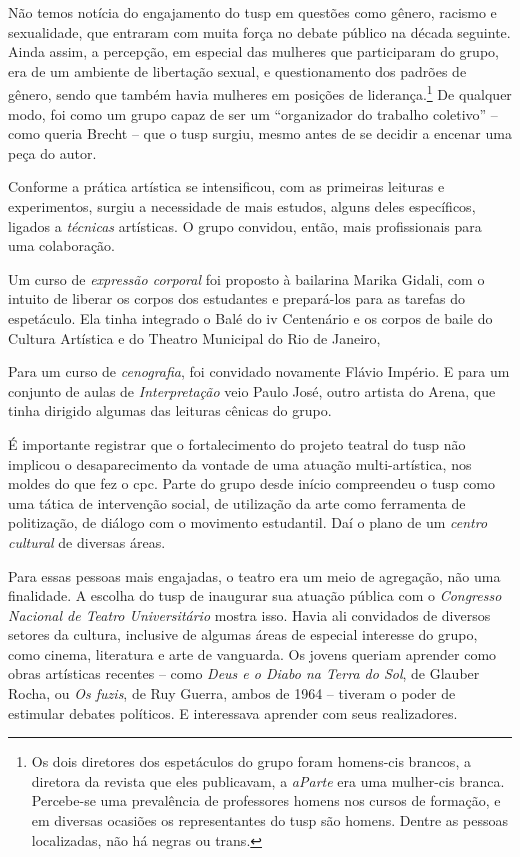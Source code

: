 Não temos notícia do engajamento do {\sc tusp} em questões como gênero,
racismo e sexualidade, que entraram com muita força no debate público na
década seguinte. Ainda assim, a percepção, em especial das mulheres que
participaram do grupo, era de um ambiente de libertação sexual, e
questionamento dos padrões de gênero, sendo que também havia mulheres em
posições de liderança.\footnote{Os dois diretores dos espetáculos do
  grupo foram homens-cis brancos, a diretora da revista que eles
  publicavam, a {\it aParte} era uma mulher-cis branca. Percebe-se uma
  prevalência de professores homens nos cursos de formação, e em
  diversas ocasiões os representantes do {\sc tusp} são homens. Dentre as
  pessoas localizadas, não há negras ou trans.} De qualquer modo, foi
como um grupo capaz de ser um “organizador do trabalho coletivo” -- como
queria Brecht -- que o {\sc tusp} surgiu, mesmo antes de se decidir a encenar
uma peça do autor.

Conforme a prática artística se intensificou, com as primeiras leituras
e experimentos, surgiu a necessidade de mais estudos, alguns deles
específicos, ligados a {\it técnicas} artísticas. O grupo convidou,
então, mais profissionais para uma colaboração.

Um curso de {\it expressão corporal} foi proposto à bailarina Marika
Gidali, com o intuito de liberar os corpos dos estudantes e prepará-los
para as tarefas do espetáculo. Ela tinha integrado o Balé do {\sc iv}
Centenário e os corpos de baile do Cultura Artística e do Theatro
Municipal do Rio de Janeiro,

Para um curso de {\it cenografia}, foi convidado novamente Flávio
Império. E para um conjunto de aulas de {\it Interpretação} veio Paulo
José, outro artista do Arena, que tinha dirigido algumas das leituras
cênicas do grupo.

\subject{Frentes de cinema, literatura, música e comunicação de massa}

É importante registrar que o fortalecimento do projeto teatral do {\sc tusp}
não implicou o desaparecimento da vontade de uma atuação
multi-artística, nos moldes do que fez o {\sc cpc}. Parte do grupo desde
início compreendeu o {\sc tusp} como uma tática de intervenção social, de
utilização da arte como ferramenta de politização, de diálogo com o
movimento estudantil. Daí o plano de um {\it centro cultural} de
diversas áreas.

Para essas pessoas mais engajadas, o teatro era um meio de agregação,
não uma finalidade. A escolha do {\sc tusp} de inaugurar sua atuação pública
com o {\it Congresso Nacional de Teatro Universitário} mostra isso.
Havia ali convidados de diversos setores da cultura, inclusive de
algumas áreas de especial interesse do grupo, como cinema, literatura e
arte de vanguarda. Os jovens queriam aprender como obras artísticas
recentes -- como {\it Deus e o Diabo na Terra do Sol}, de Glauber Rocha,
ou {\it Os fuzis}, de Ruy Guerra, ambos de 1964 -- tiveram o poder de
estimular debates políticos. E interessava aprender com seus
realizadores.

